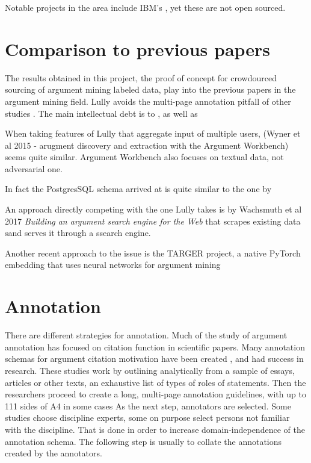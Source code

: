 \documentclass{report}
\begin{document}
Notable projects in the area include IBM's \cite{slonim2021autonomous}, yet these are not open sourced.

\section{Comparison to previous papers}
The results obtained in this project, the proof of concept for crowdourced sourcing of argument mining labeled data, play into the previous papers in the argument mining field.
Lully avoids the multi-page annotation pitfall of other studies \cite{teufel_towards_2009}.
The main intellectual debt is to \cite{von_ahn_designing_2008}, as well as \cite{poesio_phrase_2013}

When taking features of Lully that aggregate input of multiple users, (Wyner et al 2015 - arugment discovery and extraction with the Argument Workbench) seems quite similar. Argument Workbench also focuses on textual data, not adversarial one. 

In fact the PostgresSQL schema arrived at is quite similar to the one by 
\cite{abbott_internet_2016}

An approach directly competing with the one Lully takes is by Wachsmuth et al 2017 \textit{Building an argument search engine for the Web} that scrapes existing data sand serves it through a ssearch engine.
\cite{wachsmuth_building_2017}

\cite{fromm_towards_2022}

Another recent approach to the issue is the TARGER project, a native PyTorch embedding that uses neural networks for argument mining

\cite{chernodub_targer_2019}

\section{Annotation}
There are different strategies for annotation. Much of the study of argument annotation has focused on citation function in scientific papers.
Many annotation schemas for argument citation motivation have been created \cite{teufel_scientific_2014}, \cite{mann_rhetorical_1987} and had success in research.
These studies work by outlining analytically from a sample of essays, articles or other texts, an exhaustive list of types of roles of statements.
Then the researchers proceed to create a long, multi-page annotation guidelines, with up to 111 sides of A4 in some cases \cite{teufel_towards_2009}
As the next step, annotators are selected. Some studies choose discipline experts, some on purpose select persons not familiar with the discipline.
That is done in order to increase domain-independence of the annotation schema.
The following step is usually to collate the annotations created by the annotators. 
\end{document}
